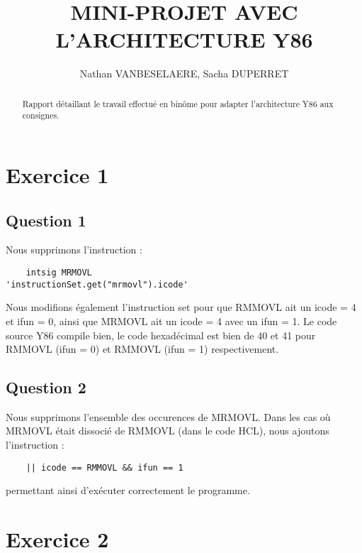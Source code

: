 \documentclass[a4paper,10pt]{article}
\title{MINI-PROJET AVEC L'ARCHITECTURE Y86}
\author{Nathan VANBESELAERE, Sacha DUPERRET}
\begin{document}
\maketitle

\vspace{30pt}

\begin{abstract}
Rapport détaillant le travail effectué en binôme pour adapter l'architecture Y86 aux consignes.
\end{abstract}

\vspace{30pt}

\tableofcontents

\newpage
\section{Exercice 1}
\subsection{Question 1}

Nous supprimons l'instruction :
\begin{verbatim}
    intsig MRMOVL                   'instructionSet.get("mrmovl").icode'
\end{verbatim}
Nous modifions également l'instruction set pour que RMMOVL ait un icode = 4 et ifun = 0, ainsi que MRMOVL ait un icode = 4 avec un ifun = 1.
Le code source Y86 compile bien, le code hexadécimal est bien de 40 et 41 pour RMMOVL (ifun = 0) et RMMOVL (ifun = 1) respectivement.

\subsection{Question 2}
Nous supprimons l'ensemble des occurences de MRMOVL.
Dans les cas où MRMOVL était dissocié de RMMOVL (dans le code HCL), nous ajoutons l'instruction :
\begin{verbatim}
    || icode == RMMOVL && ifun == 1
\end{verbatim}
permettant ainsi d'exécuter correctement le programme.

\section{Exercice 2}
\end{document}
